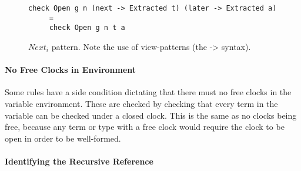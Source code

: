 \begin{figure}[h]
\begin{lstlisting}
check Open g n (next -> Extracted t) (later -> Extracted a) 
     =
     check Open g n t a
\end{lstlisting}
  \caption{$Next_{i}$ pattern. Note the use of view-patterns (the -> syntax).}
  \label{fig:next_pattern}
\end{figure}

\paragraph{No Free Clocks in Environment}
Some rules have a side condition dictating that there must no free clocks in the
variable environment. These are checked by checking that every term in the
variable can be checked under a closed clock. This is the same as no clocks
being free, because any term or type with a free clock would require the clock
to be open in order to be well-formed. 
\paragraph{Identifying the Recursive Reference}

